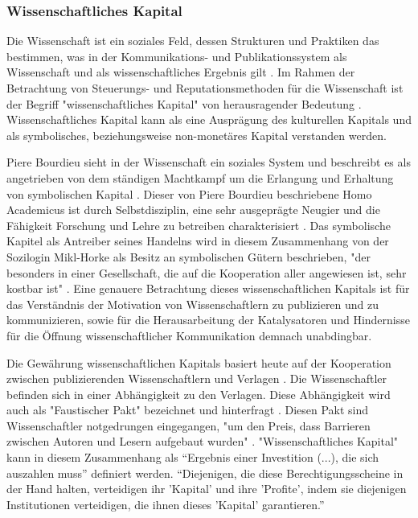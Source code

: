 \subsubsection{Wissenschaftliches Kapital}

Die Wissenschaft ist ein soziales Feld, dessen Strukturen und Praktiken das bestimmen, was in der Kommunikations- und Publikationssystem als Wissenschaft und als wissenschaftliches Ergebnis gilt \cite{mikl_2010_soziologie}. Im Rahmen der Betrachtung von Steuerungs- und Reputationsmethoden für die Wissenschaft ist der Begriff "wissenschaftliches Kapital" von herausragender Bedeutung \cite{Barl_sius_2008}. Wissenschaftliches Kapital kann als eine Ausprägung des kulturellen Kapitals und als symbolisches, beziehungsweise non-monetäres Kapital \cite{irmer2011} \cite{hagner_2015_sache_buches} \cite{bourdieu_1988_homo} verstanden werden.

Piere Bourdieu sieht in der Wissenschaft ein soziales System und beschreibt es als angetrieben von dem ständigen Machtkampf um die Erlangung und Erhaltung von symbolischen Kapital \cite{bourdieu_1988_homo}. Dieser von Piere Bourdieu beschriebene Homo Academicus ist durch Selbstdisziplin, eine sehr ausgeprägte Neugier und die Fähigkeit Forschung und Lehre zu betreiben charakterisiert \cite{bourdieu_1988_homo}. Das symbolische Kapitel als Antreiber seines Handelns wird in diesem Zusammenhang von der Sozilogin Mikl-Horke als Besitz an symbolischen Gütern beschrieben, "der besonders in einer Gesellschaft, die auf die Kooperation aller angewiesen ist, sehr kostbar ist" \cite{mikl_2010_soziologie}. Eine genauere Betrachtung dieses wissenschaftlichen Kapitals ist für das Verständnis der Motivation von Wissenschaftlern zu publizieren und zu kommunizieren, sowie für die Herausarbeitung der Katalysatoren und Hindernisse für die Öffnung wissenschaftlicher Kommunikation demnach unabdingbar.

Die Gewährung wissenschaftlichen Kapitals basiert heute auf der Kooperation zwischen publizierenden Wissenschaftlern und Verlagen \cite{herb_2006}. Die Wissenschaftler befinden sich in einer Abhängigkeit zu den Verlagen. Diese Abhängigkeit wird auch als "Faustischer Pakt" bezeichnet und hinterfragt \cite{hagner_2015_sache_buches} \cite{Parks_2002_acadamic_faust}. Diesen Pakt sind Wissenschaftler notgedrungen eingegangen, "um den Preis, dass Barrieren zwischen Autoren und Lesern aufgebaut wurden" \cite{hagner_2015_sache_buches}. "Wissenschaftliches Kapital" kann in diesem Zusammenhang als “Ergebnis einer Investition (...), die sich auszahlen muss” \cite{herb_2006} definiert werden. “Diejenigen, die diese Berechtigungsscheine in der Hand halten, verteidigen ihr 'Kapital' und ihre 'Profite', indem sie diejenigen Institutionen verteidigen, die ihnen dieses 'Kapital' garantieren.” \cite{Bourdieu_1992}

